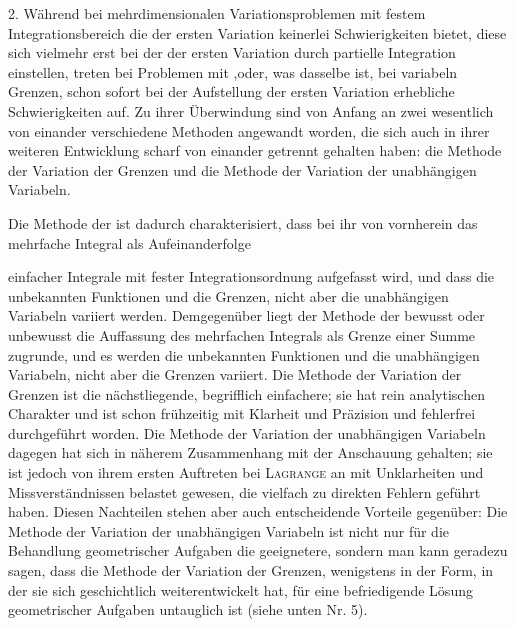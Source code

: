 2. Während bei mehrdimensionalen Variationsproblemen mit festem Integrationsbereich
die  der ersten Variation keinerlei Schwierigkeiten
bietet, diese sich vielmehr erst bei der  der ersten
Variation durch partielle Integration einstellen, treten bei Problemen mit
,\linebreak oder, was dasselbe ist, bei variabeln
Grenzen, schon sofort bei der Aufstellung der ersten Variation erhebliche
Schwierigkeiten auf. Zu ihrer Überwindung sind von Anfang an zwei wesentlich
von einander verschiedene Methoden angewandt worden, die sich auch
in ihrer weiteren Entwicklung scharf von einander getrennt gehalten haben:
die Methode der Variation der Grenzen und die Methode der Variation der
unabhängigen Variabeln.

Die Methode der  ist dadurch charakterisiert,
dass bei ihr von vornherein das mehrfache Integral als Aufeinanderfolge
\par\clearpage{}
\noindent einfacher Integrale mit fester Integrationsordnung aufgefasst wird, und dass die
unbekannten Funktionen und die Grenzen, nicht aber die unabhängigen
Variabeln variiert werden. Demgegenüber liegt der Methode der \linebreak bewusst oder unbewusst die Auffassung des
mehrfachen Integrals als Grenze einer Summe zugrunde, und es werden die
unbekannten Funktionen und die unabhängigen Variabeln, nicht aber die
Grenzen variiert. Die Methode der Variation der Grenzen ist die nächstliegende,
begrifflich einfachere; sie hat rein analytischen Charakter und ist
schon frühzeitig mit Klarheit und Präzision und fehlerfrei durchgeführt worden.
Die Methode der Variation der unabhängigen Variabeln dagegen hat sich in
näherem Zusammenhang mit der Anschauung gehalten; sie ist jedoch von
ihrem ersten Auftreten bei \textsc{Lagrange} an mit Unklarheiten und Missverständnissen
belastet gewesen, die vielfach zu direkten Fehlern geführt haben.
Diesen Nachteilen stehen aber auch entscheidende Vorteile gegenüber: Die
Methode der Variation der unabhängigen Variabeln ist nicht nur für die Behandlung
geometrischer Aufgaben die geeignetere, sondern man kann geradezu
sagen, dass die Methode der Variation der Grenzen, wenigstens in der Form,
in der sie sich geschichtlich weiterentwickelt hat, für eine befriedigende Lösung
geometrischer Aufgaben untauglich ist (siehe unten Nr. 5).
\par\clearpage\endgroup
